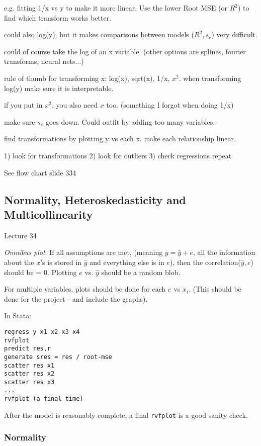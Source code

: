 \documentclass[11pt, oneside]{article}   	%
\begin{document}
e.g. fitting 1/x vs y to make it more linear. Use the lower Root MSE (or $R^2$) to find which transform works better.

could also log(y), but it makes comparisons between models ($R^2, s_e$) very difficult. 

could of course take the log of an x variable. (other options are splines, fourier transforms, neural nets...)

rule of thumb for transforming x: log(x), sqrt(x), 1/x, $x^2$. when transforming log(y) make sure it is interpretable.

if you put in $x^2$, you also need $x$ too. (something I forgot when doing 1/x)

make sure $s_e$ goes down. Could outfit by adding too many variables.

find transformations by plotting y vs each x. make each relationship linear.

1) look for transformations 2) look for outliers 3) check regressions repeat

See flow chart slide 334

\subsection{Normality, Heteroskedasticity and Multicollinearity}

Lecture 34

\textit{Omnibus plot}: If all assumptions are met, (meaning $y = \hat{y} + e$, all the information about the $x$'s is stored in $\hat{y}$ and everything else is in $e$), then the correlation($\hat{y},e$) should be = 0. Plotting $e$ vs. $\hat{y}$ should be a random blob.

For multiple variables, plots should be done for each $e$ vs $x_i$. (This should be done for the project - and include the graphs).

In Stata:
\begin{verbatim}
regress y x1 x2 x3 x4
rvfplot
predict res,r
generate sres = res / root-mse
scatter res x1
scatter res x2
scatter res x3
...
rvfplot (a final time)
\end{verbatim} 

After the model is reasonably complete, a final \texttt{rvfplot} is a good sanity check.

\subsubsection{Normality}
\end{document}
